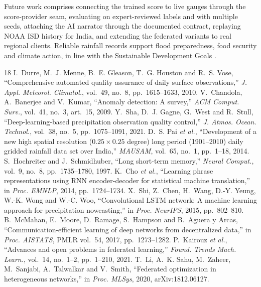 \documentclass[conference,a4paper]{IEEEtran}
\begin{document}
Future work comprises connecting the trained score to live gauges through the score-provider seam, evaluating on expert-reviewed labels and with multiple seeds, attaching the AI narrator through the documented contract, replaying NOAA ISD history for India, and extending the federated variants to real regional clients. Reliable rainfall records support flood preparedness, food security and climate action, in line with the Sustainable Development Goals \cite{un2015}.

\begin{thebibliography}{18}
 I.~Durre, M.~J. Menne, B.~E. Gleason, T.~G. Houston and R.~S. Vose, ``Comprehensive automated quality assurance of daily surface observations,'' \emph{J. Appl. Meteorol. Climatol.}, vol.~49, no.~8, pp.~1615--1633, 2010.
 V.~Chandola, A.~Banerjee and V.~Kumar, ``Anomaly detection: A survey,'' \emph{ACM Comput. Surv.}, vol.~41, no.~3, art.~15, 2009.
 Y.~Sha, D.~J. Gagne, G.~West and R.~Stull, ``Deep-learning-based precipitation observation quality control,'' \emph{J. Atmos. Ocean. Technol.}, vol.~38, no.~5, pp.~1075--1091, 2021.
 D.~S. Pai \emph{et al.}, ``Development of a new high spatial resolution ($0.25\times0.25$ degree) long period (1901--2010) daily gridded rainfall data set over India,'' \emph{MAUSAM}, vol.~65, no.~1, pp.~1--18, 2014.
 S.~Hochreiter and J.~Schmidhuber, ``Long short-term memory,'' \emph{Neural Comput.}, vol.~9, no.~8, pp.~1735--1780, 1997.
 K.~Cho \emph{et al.}, ``Learning phrase representations using RNN encoder-decoder for statistical machine translation,'' in \emph{Proc. EMNLP}, 2014, pp.~1724--1734.
 X.~Shi, Z.~Chen, H.~Wang, D.-Y. Yeung, W.-K. Wong and W.-C. Woo, ``Convolutional LSTM network: A machine learning approach for precipitation nowcasting,'' in \emph{Proc. NeurIPS}, 2015, pp.~802--810.
 B.~McMahan, E.~Moore, D.~Ramage, S.~Hampson and B.~Aguera y Arcas, ``Communication-efficient learning of deep networks from decentralized data,'' in \emph{Proc. AISTATS}, PMLR vol.~54, 2017, pp.~1273--1282.
 P.~Kairouz \emph{et al.}, ``Advances and open problems in federated learning,'' \emph{Found. Trends Mach. Learn.}, vol.~14, no.~1--2, pp.~1--210, 2021.
 T.~Li, A.~K. Sahu, M.~Zaheer, M.~Sanjabi, A.~Talwalkar and V.~Smith, ``Federated optimization in heterogeneous networks,'' in \emph{Proc. MLSys}, 2020, arXiv:1812.06127.

\end{thebibliography}
\end{document}
